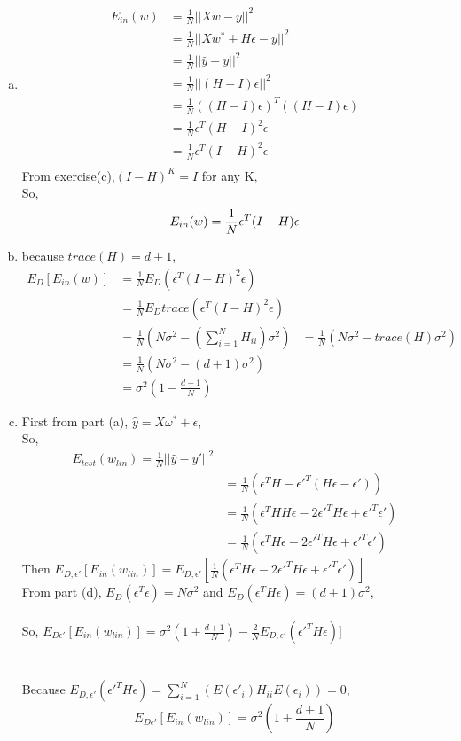 \documentclass[11pt]{article}
\begin{document}
\begin{enumerate} [(a)]
	\item \[
		\begin{aligned}
		E_{in}(w)&=\frac{1}{N}||Xw-y||^2\\
		&= \frac{1}{N}||Xw^*+H\epsilon-y||^2\\
		&= \frac{1}{N}||\hat{y}-y||^2\\
		&= \frac{1}{N}||(H-I)\epsilon||^2\\
		&= \frac{1}{N}((H-I)\epsilon)^T((H-I)\epsilon)\\
		&= \frac{1}{N}\epsilon^T(H-I)^2\epsilon\\
		&= \frac{1}{N}\epsilon^T(I-H)^2\epsilon\\
		\end{aligned}
	\]
	From exercise(c),$ (I-H)^K=I$ for any K,\\
	So, \[
		E_{in}(w)=\frac{1}{N}\epsilon^T(I-H)\epsilon\\
	\]
	\newpage
	\item because $trace(H) = d+1$, \[ 
		\begin{aligned}
		E_D[E_{in}(w)] &= \frac{1}{N}E_D(\epsilon^T(I-H)^2\epsilon)\\
		&= \frac{1}{N}E_Dtrace(\epsilon^T(I-H)^2\epsilon)\\
		&= \frac{1}{N}(N\sigma^2-(\sum^N_{i=1}H_{ii})\sigma^2)
		&= \frac{1}{N}(N\sigma^2-trace(H)\sigma^2)\\
		&= \frac{1}{N}(N\sigma^2-(d+1)\sigma^2)\\
		&= \sigma^2(1-\frac{d+1}{N})
		\end{aligned}
	\]
	\item First from part (a), $\hat{y} = X\omega^*+\epsilon$,\\
	So, \[
		\begin{aligned}
		E_{test}(w_{lin})=\frac{1}{N}||\hat{y}-y'||^2\\
		&= \frac{1}{N}(\epsilon^TH-\epsilon'^{T}(H\epsilon-\epsilon'))\\
		&= \frac{1}{N}(\epsilon^THH\epsilon-2\epsilon'^TH\epsilon+\epsilon'^T\epsilon')\\
		&=\frac{1}{N}(\epsilon^TH\epsilon-2\epsilon'^TH\epsilon+\epsilon'^T\epsilon')
		\end{aligned}
	\]
	Then $E_{D,\epsilon'}[E_{in}(w_{lin})]=E_{D,\epsilon'}[\frac{1}{N}(\epsilon^TH\epsilon-2\epsilon'^TH\epsilon+\epsilon'^T\epsilon')]$\\
	From part (d), $E_D(\epsilon^T\epsilon)=N\sigma^2$ and $E_D(\epsilon^TH\epsilon)=(d+1)\sigma^2$,\\\\
	So, $E_{D\epsilon'}[E_{in}(w_{lin})]=\sigma^2(1+\frac{d+1}{N})-\frac{2}{N}E_{D,\epsilon'}(\epsilon'^TH\epsilon)]$\\\\
	\\Because $E_{D,\epsilon'}(\epsilon'^TH\epsilon)=\sum^N_{i=1}(E(\epsilon'_i)H_{ii}E(\epsilon_i))=0$, \[
		E_{D\epsilon'}[E_{in}(w_{lin})] = \sigma^2(1+\frac{d+1}{N})
	\]
\end{enumerate}
\newpage
\end{document}
